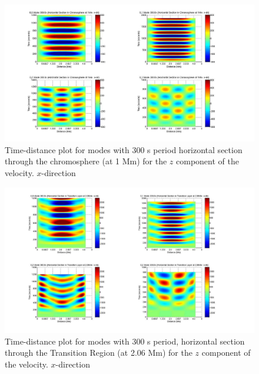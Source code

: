 \documentclass[preprint,authoryear,12pt]{elsarticle}
\begin{document}



\begin{figure}[h]
\includegraphics[scale=0.9]{imrescale/dt_300_0_0_hor_x_1Mm.jpg}
\caption{Time-distance plot for modes with 300 s period horizontal section through the chromosphere (at 1 Mm) for the $z$  component of the velocity. $x$-direction}
\label{Fig11}
\end{figure}

\begin{figure}[h]
\includegraphics[scale=0.9]{imrescale/dt_300_hor_x_2p06Mm.jpg}
\caption{Time-distance plot for modes with 300 s period, horizontal section through the Transition Region (at 2.06 Mm) 
for the $z$  component of the velocity. $x$-direction}
\end{figure}
\end{document}

